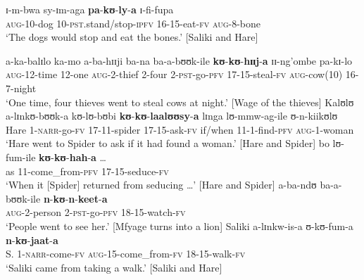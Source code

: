 \begin{exe}
\ex \label{exLocInfMovementVerb16} \gll ɪ-m-bwa sy-ɪm-aga \textbf{pa}-\textbf{kʊ}-\textbf{ly}-\textbf{a} ɪ-fi-fupa\\
\textsc{aug}-10-dog 10-\textsc{pst}.stand/stop-\textsc{ipfv} 16-15-eat-\textsc{fv} \textsc{aug}-8-bone\\
\glt \lq The dogs would stop and eat the bones.' [Saliki and Hare]

\ex \label{exLocInfMovementVerb17purpose}
\gll a-ka-balɪlo ka-mo a-ba-hɪɪji ba-na ba-a-bʊʊk-ile \textbf{kʊ}-\textbf{kʊ}-\textbf{hɪɪj}-\textbf{a} ɪɪ-ng'ombe pa-kɪ-lo\\
\textsc{aug}-12-time 12-one \textsc{aug}-2-thief 2-four 2-\textsc{pst}-go-\textsc{pfv} 17-15-steal-\textsc{fv} \textsc{aug}-cow(10) 16-7-night\\
\glt \lq One time, four thieves went to steal cows at night.' [Wage of the thieves]
\ex \label{exLocInfMovementVerb17both}
\gll Kalʊlʊ a-lɪnkʊ-bʊʊk-a kʊ-lʊ-bʊbi \textbf{kʊ}-\textbf{kʊ}-\textbf{laalʊʊsy}-\textbf{a} lɪnga lʊ-mmw-ag-ile ʊ-n-kiikʊlʊ\\
Hare 1-\textsc{narr}-go-\textsc{fv} 17-11-spider 17-15-ask-\textsc{fv} if/when 11-1-find-\textsc{pfv} \textsc{aug}-1-woman\\
\glt \lq Hare went to Spider to ask if it had found a woman.' [Hare and Spider]
\ex \label{exLocInfMovementVerb17locational}
\gll bo lʊ-fum-ile \textbf{kʊ}-\textbf{kʊ}-\textbf{hah}-\textbf{a} \ldots\\
as 11-come\_from-\textsc{pfv} 17-15-seduce-\textsc{fv} {}\\
\glt \lq When it [Spider] returned from seducing \ldots' [Hare and Spider]
\ex \label{exLocInfMovementVerb18purpose}
\gll a-ba-ndʊ ba-a-bʊʊk-ile \textbf{n}-\textbf{kʊ}-\textbf{n}-\textbf{keet}-\textbf{a}\\
\textsc{aug}-2-person 2-\textsc{pst}-go-\textsc{pfv} 18-15-watch-\textsc{fv}\\
\glt \lq People went to see her.' [Mfyage turns into a lion]
\ex \label{exLocInfMovementVerb18locational}
\gll Saliki a-lɪnkw-is-a ʊ-kʊ-fum-a \textbf{n}-\textbf{kʊ}-\textbf{jaat}-\textbf{a}\\
S. 1-\textsc{narr}-come-\textsc{fv} \textsc{aug}-15-come\_from-\textsc{fv} 18-15-walk-\textsc{fv}\\
\glt \lq Saliki came from taking a walk.' [Saliki and Hare]
\end{exe}

